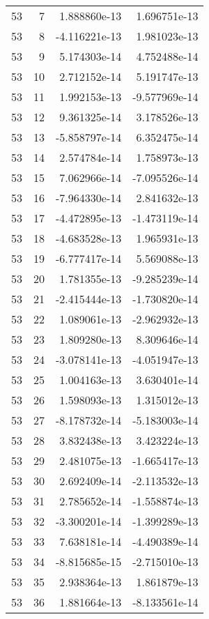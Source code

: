 \begin{tabular}{rrrr}
  53 &    7 &  1.888860e-13 &  1.696751e-13 \\
  53 &    8 & -4.116221e-13 &  1.981023e-13 \\
  53 &    9 &  5.174303e-14 &  4.752488e-14 \\
  53 &   10 &  2.712152e-14 &  5.191747e-13 \\
  53 &   11 &  1.992153e-13 & -9.577969e-14 \\
  53 &   12 &  9.361325e-14 &  3.178526e-13 \\
  53 &   13 & -5.858797e-14 &  6.352475e-14 \\
  53 &   14 &  2.574784e-14 &  1.758973e-13 \\
  53 &   15 &  7.062966e-14 & -7.095526e-14 \\
  53 &   16 & -7.964330e-14 &  2.841632e-13 \\
  53 &   17 & -4.472895e-13 & -1.473119e-14 \\
  53 &   18 & -4.683528e-13 &  1.965931e-13 \\
  53 &   19 & -6.777417e-14 &  5.569088e-13 \\
  53 &   20 &  1.781355e-13 & -9.285239e-14 \\
  53 &   21 & -2.415444e-13 & -1.730820e-14 \\
  53 &   22 &  1.089061e-13 & -2.962932e-13 \\
  53 &   23 &  1.809280e-13 &  8.309646e-14 \\
  53 &   24 & -3.078141e-13 & -4.051947e-13 \\
  53 &   25 &  1.004163e-13 &  3.630401e-14 \\
  53 &   26 &  1.598093e-13 &  1.315012e-13 \\
  53 &   27 & -8.178732e-14 & -5.183003e-14 \\
  53 &   28 &  3.832438e-13 &  3.423224e-13 \\
  53 &   29 &  2.481075e-13 & -1.665417e-13 \\
  53 &   30 &  2.692409e-14 & -2.113532e-13 \\
  53 &   31 &  2.785652e-14 & -1.558874e-13 \\
  53 &   32 & -3.300201e-14 & -1.399289e-13 \\
  53 &   33 &  7.638181e-14 & -4.490389e-14 \\
  53 &   34 & -8.815685e-15 & -2.715010e-13 \\
  53 &   35 &  2.938364e-13 &  1.861879e-13 \\
  53 &   36 &  1.881664e-13 & -8.133561e-14 \\

\end{tabular}
